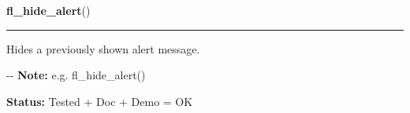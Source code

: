 \hspace{.8\funcindent}\begin{boxedminipage}{\funcwidth}

    \raggedright \textbf{fl\_hide\_alert}()

    \vspace{-1.5ex}

    \rule{\textwidth}{0.5\fboxrule}
\setlength{\parskip}{2ex}

Hides a previously shown alert message.

-{}-
\setlength{\parskip}{1ex}
\textbf{Note:} 
e.g. fl\_hide\_alert()


\textbf{Status:} 
Tested + Doc + Demo = OK


    \end{boxedminipage}

    \label{xformslib:flgoodies:fl_show_input}

    \vspace{0.5ex}

